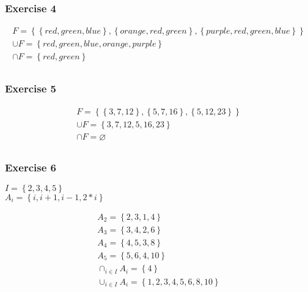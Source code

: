 \begin{questions}
\subsubsection{Exercise 4}
\begin{align*}
  F = \left\{ \left\{red, green, blue \right\}, \left\{orange, red,
  green\right\}, \left\{purple, red, green, blue \right\} \right\} \\
  \cup F = \left\{ red, green, blue, orange, purple\right\} \\
  \cap F = \left\{ red, green\right\} \\
\end{align*}

\subsubsection{Exercise 5}
\begin{align*}
  F = \left\{ \left\{3,7,12 \right\}, \left\{5,7,16
  \right\}, \left\{5,12,23 \right\} \right\} \\
  \cup F = \left\{ 3,7,12,5,16,23 \right\} \\
  \cap F = \varnothing \\
\end{align*}

\subsubsection{Exercise 6}
\begin{center}
  $I = \left\{2,3,4,5\right\}$ \\
  $A_i = \left\{i, i+1, i-1, 2*i\right\}$ \\
\end{center}
\begin{align*}
  A_2 = \left\{2,3,1,4\right\} \\
  A_3 = \left\{3,4,2,6\right\} \\
  A_4 = \left\{4,5,3,8\right\} \\
  A_5 = \left\{5,6,4,10\right\} \\
  \cap_{i \in I}A_i = \left\{4 \right\} \\
  \cup_{i \in I}A_i = \left\{1,2,3,4,5,6,8,10 \right\} \\
\end{align*}


\end{questions}
